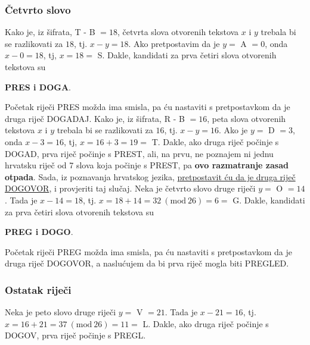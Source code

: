 \documentclass[a4paper,12pt,oneside]{article}
\begin{document}
\subsubsection*{Četvrto slovo}
Kako je, iz šifrata, T - B $= 18$, četvrta slova otvorenih tekstova $x$ i $y$ trebala bi se razlikovati za $18$, tj. $x - y = 18$.
\newline \newline
\noindent Ako pretpostavim da je $y =$ A $= 0$, onda $x - 0 = 18$, tj, $x = 18 = $ S. Dakle, kandidati za prva četiri slova otvorenih tekstova su
\begin{center}
	\textbf{PRES i DOGA}.
\end{center}
Početak riječi PRES možda ima smisla, pa ću nastaviti s pretpostavkom da je druga riječ DOGADAJ.
\newline \newline
\noindent Kako je, iz šifrata,  R - B $= 16$, peta slova otvorenih tekstova $x$ i $y$ trebala bi se razlikovati za $16$, tj. $x - y = 16$. 
\newline \newline
\noindent Ako je $y =$ D $= 3$, onda $x - 3 = 16$, tj, $x = 16 + 3 = 19 = $ T. Dakle, ako druga riječ počinje s DOGAD, prva riječ počinje s PREST, ali, na prvu, ne poznajem ni jednu hrvatsku riječ od 7 slova koja počinje s PREST, pa \textbf{ovo razmatranje zasad otpada}.
\newline \newline
\noindent Sada, iz poznavanja hrvatskog jezika, \underline{pretpostavit ću da je druga riječ DOGOVOR}, i provjeriti taj slučaj. 
\newline \newline
Neka je četvrto slovo druge riječi $y =$ O $= 14$. Tada je $x - 14 = 18$, tj. $x = 18 + 14 = 32 \ (\text{mod} \ 26) = 6 =$ G. Dakle, kandidati za prva četiri slova otvorenih tekstova su
\begin{center}
	\textbf{PREG i DOGO}.
\end{center}
Početak riječi PREG možda ima smisla, pa ću nastaviti s pretpostavkom da je druga riječ DOGOVOR, a naslućujem da bi prva riječ mogla biti PREGLED.

\subsubsection*{Ostatak riječi}
Neka je peto slovo druge riječi $y =$ V $= 21$. Tada je $x - 21 = 16$, tj. $x = 16 + 21 = 37 \ (\text{mod} \ 26) = 11 =$ L. Dakle, ako druga riječ počinje s DOGOV, prva riječ počinje s PREGL.
\end{document}
